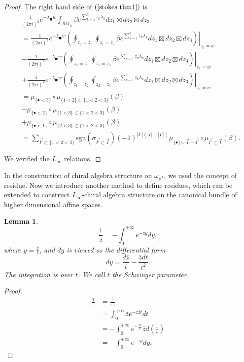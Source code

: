 \documentclass[11pt]{amsart}
\newtheorem{lem}[thm]{Lemma}
\theoremstyle{definition}
\theoremstyle{remark}
\numberwithin{equation}{section}
\begin{document}
\begin{proof}
The right hand side of $(\ref{stokes thm1})$ is 
\begin{align*}
     &
     \frac{1}{(2\pi i)^{2}}e^{-\lambda_{\blacksquare }w}\int_{\partial M_{w}}\beta e^{\sum_{k=1}^{3}z_{k}\lambda_{k}}dz_{1}\boxtimes dz_{2}\boxtimes dz_{3}\\
     &=
     \frac{1}{(2\pi i)^{2}}e^{-\lambda_{\blacksquare }w}\left.\left(\oint_{z_{2}=z_{3}}\oint_{z_{1}=z_{2}}\beta e^{\sum_{k=1}^{3}z_{k}\lambda_{k}}dz_{1}\boxtimes dz_{2}\boxtimes dz_{3}\right)\right|_{z_{3}=w}\\
     &-
     \frac{1}{(2\pi i)^{2}}e^{-\lambda_{\blacksquare }w}\left.\left(\oint_{z_{2}=z_{3}}\oint_{z_{1}=z_{3}}\beta e^{\sum_{k=1}^{3}z_{k}\lambda_{k}}dz_{1}\boxtimes dz_{2}\boxtimes dz_{3}\right)\right|_{z_{3}=w}\\
     &+
     \frac{1}{(2\pi i)^{2}}e^{-\lambda_{\blacksquare }w}\left.\left(\oint_{z_{1}=z_{2}}\oint_{z_{2}=z_{3}}\beta e^{\sum_{k=1}^{3}z_{k}\lambda_{k}}dz_{1}\boxtimes dz_{2}\boxtimes dz_{3}\right)\right|_{z_{3}=w}\\
     &=
     \mu_{\{\bullet<3\}}\circ \mu_{\{1<2\}\subset\{1<2<3\}}(\beta)\\
     &-
     \mu_{\{\bullet<2\}}\circ \mu_{\{1<3\}\subset\{1<2<3\}}(\beta)\\
     &+
     \mu_{\{\bullet<1\}}\circ \mu_{\{2<3\}\subset\{1<2<3\}}(\beta)\\
     &=  
     \sum_{\vec{I'}\subset\{1<2<3\}}\mathrm{sgn}(\sigma_{\vec{I'}\subset\vec{I}})(-1)^{|I'|(|I|-|I'|)}\mu_{\{\bullet\}\cup\vec{I}-\vec{I'}}\circ \mu_{\vec{I'}\subset\vec{I}}(\beta).
\end{align*}

We verified the $L_{\infty }$ relations.
\end{proof}
In the construction of chiral algebra structure on $\omega_{\mathbb{A}^{1}}$, we used the concept of residue. Now we introduce another method to define residues, which can be extended to construct $L_{\infty}$-chiral algebra structure on the canonical bundle of higher dimensional affine spaces.
\begin{lem}
    $$
    \frac{1}{z}=-\int_{0}^{+\infty}e^{-zy}dy,
    $$
    where $y=\frac{\bar{z}}{t}$, and $dy$ is viewed as the differential form $$dy=\frac{d\bar{z}}{t}-\frac{\bar{z}dt}{t^2}.$$The integration is over $t$. We call $t$ the Schwinger parameter. 
\end{lem}
\begin{proof}
\begin{align*}
        \frac{1}{z}&=\frac{\bar{z}}{z\bar{z}}\\
        &=
\int_{0}^{+\infty}\bar{z}e^{-z\bar{z}t}dt\\
        &=
        -\int_{0}^{+\infty}e^{-\frac{z\bar{z}}{t}}\bar{z}d\left(\frac{1}{t}\right)\\
        &=
-\int_{0}^{+\infty}e^{-zy}dy.
\end{align*}
\end{proof}
\end{document}
